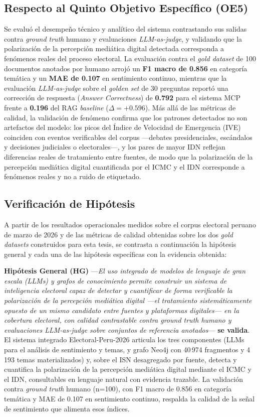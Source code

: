 \subsection*{Respecto al Quinto Objetivo Específico (OE5)}
Se evaluó el desempeño técnico y analítico del sistema contrastando sus salidas contra \textit{ground truth} humano y evaluaciones \textit{LLM-as-judge}, y validando que la polarización de la percepción mediática digital detectada corresponda a fenómenos reales del proceso electoral. La evaluación contra el \textit{gold dataset} de 100 documentos anotados por humano arrojó un \textbf{F1 macro de 0.856} en categoría temática y un \textbf{MAE de 0.107} en sentimiento continuo, mientras que la evaluación \textit{LLM-as-judge} sobre el \textit{golden set} de 30 preguntas reportó una corrección de respuesta (\textit{Answer Correctness}) de \textbf{0.792} para el sistema MCP frente a \textbf{0.196} del RAG \textit{baseline} ($\Delta=+0.596$). Más allá de las métricas de calidad, la validación de fenómeno confirma que los patrones detectados no son artefactos del modelo: los picos del Índice de Velocidad de Emergencia (IVE) coinciden con eventos verificables del corpus —debates presidenciales, escándalos y decisiones judiciales o electorales—, y los pares de mayor IDN reflejan diferencias reales de tratamiento entre fuentes, de modo que la polarización de la percepción mediática digital cuantificada por el ICMC y el IDN corresponde a fenómenos reales y no a ruido de etiquetado.

\subsection*{Verificación de Hipótesis}

A partir de los resultados operacionales medidos sobre el corpus electoral peruano de marzo de 2026 y de las métricas de calidad obtenidas sobre los dos \textit{gold datasets} construidos para esta tesis, se contrasta a continuación la hipótesis general y cada una de las hipótesis específicas con la evidencia obtenida:

\textbf{Hipótesis General (HG)} —\textit{El uso integrado de modelos de lenguaje de gran escala (LLMs) y grafos de conocimiento permite construir un sistema de inteligencia electoral capaz de detectar y cuantificar de forma verificable la polarización de la percepción mediática digital —el tratamiento sistemáticamente opuesto de un mismo candidato entre fuentes y plataformas digitales— en la cobertura electoral, con calidad contrastable contra ground truth humano y evaluaciones LLM-as-judge sobre conjuntos de referencia anotados}— \textbf{se valida}. El sistema integrado Electoral-Peru-2026 articula los tres componentes (LLMs para el análisis de sentimiento y temas, y grafo Neo4j con 40\,974 fragmentos y 4\,193 temas materializados) y, sobre el ISN desagregado por fuente, detecta y cuantifica la polarización de la percepción mediática digital mediante el ICMC y el IDN, consultables en lenguaje natural con evidencia trazable. La validación contra \textit{ground truth} humano (n=100), con F1 macro de 0.856 en categoría temática y MAE de 0.107 en sentimiento continuo, respalda la calidad de la señal de sentimiento que alimenta esos índices.

